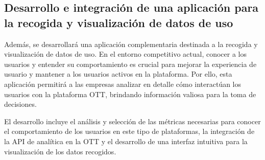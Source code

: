 \subsection{Desarrollo e integración de una aplicación para la recogida y visualización de datos de uso}
\label{sec:Analitica_introduccion}

Además, se desarrollará una aplicación complementaria destinada a la recogida y visualización de datos de uso. En el entorno competitivo
actual, conocer a los usuarios y entender su comportamiento es crucial para mejorar la experiencia de usuario y mantener a los usuarios 
activos en la plataforma. Por ello, esta aplicación permitirá a las empresas analizar en detalle cómo interactúan los usuarios con la 
plataforma OTT, brindando información valiosa para la toma de decisiones.

El desarrollo incluye el análisis y selección de las métricas necesarias para conocer el comportamiento de los usuarios en este tipo de 
plataformas, la integración de la API de analítica en la OTT y el desarrollo de una interfaz intuitiva para la visualización de los datos recogidos.
